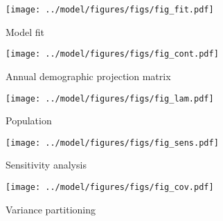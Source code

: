 \documentclass[11pt]{article}
\begin{document}
%
% 






\clearpage



\clearpage

\begin{figure}
\centering
\texttt{[image: ../model/figures/figs/fig\_fit.pdf]}
\caption{\label{fig:fit}
Model fit
}
\end{figure}

\begin{figure}
\centering
\texttt{[image: ../model/figures/figs/fig\_cont.pdf]}
\caption{\label{fig:cont}
Annual demographic projection matrix
}
\end{figure}

\begin{figure}
\centering
\texttt{[image: ../model/figures/figs/fig\_lam.pdf]}
\caption{\label{fig:pop}
Population
}
\end{figure}

\begin{figure}
\centering
\texttt{[image: ../model/figures/figs/fig\_sens.pdf]}
\caption{\label{fig:sens}
Sensitivity analysis
}
\end{figure}

\begin{figure}
\centering
\texttt{[image: ../model/figures/figs/fig\_cov.pdf]}
\caption{\label{fig:cov}
Variance partitioning
}
\end{figure}
\end{document}

